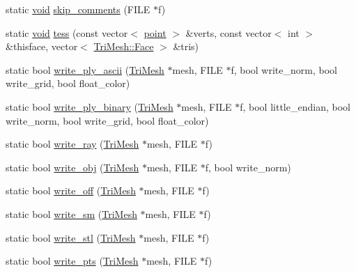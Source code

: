 \begin{DoxyCompactItemize}
\item 
static \hyperlink{namespacetrimesh_a784ddfd979e1c579bda795a8edfc3f43}{void} \hyperlink{namespacetrimesh_acfa6982e734eac19021b2dfebbaf96d7}{skip\+\_\+comments} (F\+I\+LE $\ast$f)
\item 
static \hyperlink{namespacetrimesh_a784ddfd979e1c579bda795a8edfc3f43}{void} \hyperlink{namespacetrimesh_ab9faa1a09be480a9b7b63874e84d514c}{tess} (const vector$<$ \hyperlink{namespacetrimesh_a325b99fd6454b22fa4c4bc3223271b2c}{point} $>$ \&verts, const vector$<$ int $>$ \&thisface, vector$<$ \hyperlink{classtrimesh_1_1TriMesh_a06cb64bb6435d5cf4d7b24d2950fe8e7}{Tri\+Mesh\+::\+Face} $>$ \&tris)
\item 
static bool \hyperlink{namespacetrimesh_ab776a2c7edecbb77833442c20e69273e}{write\+\_\+ply\+\_\+ascii} (\hyperlink{classtrimesh_1_1TriMesh}{Tri\+Mesh} $\ast$mesh, F\+I\+LE $\ast$f, bool write\+\_\+norm, bool write\+\_\+grid, bool float\+\_\+color)
\item 
static bool \hyperlink{namespacetrimesh_ae31b59d3573e30dd28c45a717fee89f9}{write\+\_\+ply\+\_\+binary} (\hyperlink{classtrimesh_1_1TriMesh}{Tri\+Mesh} $\ast$mesh, F\+I\+LE $\ast$f, bool little\+\_\+endian, bool write\+\_\+norm, bool write\+\_\+grid, bool float\+\_\+color)
\item 
static bool \hyperlink{namespacetrimesh_a4271b178e08a8202cf106be6fb327632}{write\+\_\+ray} (\hyperlink{classtrimesh_1_1TriMesh}{Tri\+Mesh} $\ast$mesh, F\+I\+LE $\ast$f)
\item 
static bool \hyperlink{namespacetrimesh_a1fd27491a7f94169a1bf5da168bf0a4e}{write\+\_\+obj} (\hyperlink{classtrimesh_1_1TriMesh}{Tri\+Mesh} $\ast$mesh, F\+I\+LE $\ast$f, bool write\+\_\+norm)
\item 
static bool \hyperlink{namespacetrimesh_a8913ffcec7ca6172c82f3b93a1c89318}{write\+\_\+off} (\hyperlink{classtrimesh_1_1TriMesh}{Tri\+Mesh} $\ast$mesh, F\+I\+LE $\ast$f)
\item 
static bool \hyperlink{namespacetrimesh_a1931cc0ec4adc8e542720791792a5b13}{write\+\_\+sm} (\hyperlink{classtrimesh_1_1TriMesh}{Tri\+Mesh} $\ast$mesh, F\+I\+LE $\ast$f)
\item 
static bool \hyperlink{namespacetrimesh_aeece170ed507bd3e0bb58315b2f7ee77}{write\+\_\+stl} (\hyperlink{classtrimesh_1_1TriMesh}{Tri\+Mesh} $\ast$mesh, F\+I\+LE $\ast$f)
\item 
static bool \hyperlink{namespacetrimesh_a12a743cd1fd6e9ed450ff82efba912bb}{write\+\_\+pts} (\hyperlink{classtrimesh_1_1TriMesh}{Tri\+Mesh} $\ast$mesh, F\+I\+LE $\ast$f)
\item 

\end{DoxyCompactItemize}
